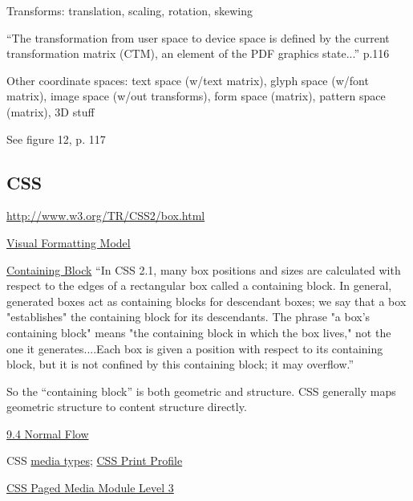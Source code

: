 \documentclass[12pt]{tufte-handout}
\numberwithin{equation}{subsection}
\numberwithin{equation}{subsection}
\begin{document}
\begin{appendices}
                Transforms: translation, scaling, rotation, skewing


                ``The transformation from user space to device space is defined by the current transformation matrix (CTM), an element of the PDF graphics state...'' p.116

                Other coordinate spaces: text space (w/text matrix), glyph space
                (w/font matrix), image space (w/out transforms), form space (matrix),
                pattern space (matrix), 3D stuff

                See figure 12, p. 117

                \subsection{CSS}

                \url{http://www.w3.org/TR/CSS2/box.html}

                \href{http://www.w3.org/TR/CSS2/visuren.html}{Visual Formatting Model}

                \href{http://www.w3.org/TR/CSS2/visuren.html#containing-block}{Containing
                  Block} ``In CSS 2.1, many box positions and sizes are calculated
                with respect to the edges of a rectangular box called a containing
                block. In general, generated boxes act as containing blocks for
                descendant boxes; we say that a box "establishes" the containing block
                for its descendants. The phrase "a box's containing block" means "the
                containing block in which the box lives," not the one it
                generates....Each box is given a position with respect to its
                containing block, but it is not confined by this containing block; it
                may overflow.''

                So the ``containing block'' is both geometric and structure.  CSS
                generally maps geometric structure to content structure directly.

                \href{http://www.w3.org/TR/CSS2/visuren.html#normal-flow}{9.4 Normal Flow}

                CSS \href{http://www.w3.org/TR/CSS2/media.html}{media types}; \href{http://www.w3.org/TR/css-print/}{CSS Print Profile}

                \href{http://www.w3.org/TR/css3-page/}{CSS Paged Media Module Level 3}


\end{appendices}
\end{document}
